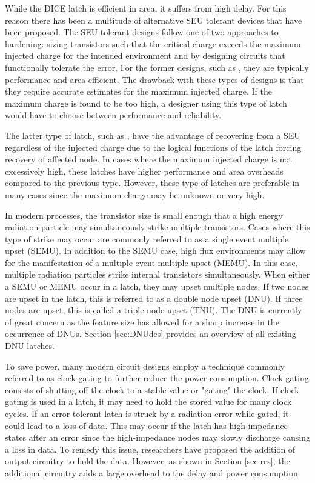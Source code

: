 While the DICE latch is efficient in area, it suffers from high delay. For this reason there has been a multitude of alternative SEU tolerant devices that have been proposed. The SEU tolerant designs follow one of two approaches to hardening: sizing transistors such that the critical charge exceeds the maximum injected charge for the intended environment and by designing circuits that functionally tolerate the error. For the former designs, such as \cite{NicoFeedback}, they are typically performance and area efficient. The drawback with these types of designs is that they require accurate estimates for the maximum injected charge. If the maximum charge is found to be too high, a designer using this type of latch would have to choose between performance and reliability. 

The latter type of latch, such as \cite{HIPER, FERST, Hazucha, SEMULatch, Multivdd, BISER}, have the advantage of recovering from a SEU regardless of the injected charge due to the logical functions of the latch forcing recovery of affected node. In cases where the maximum injected charge is not excessively high, these latches have higher performance and area overheads compared to the previous type. However, these type of latches are preferable in many cases since the maximum charge may be unknown or very high. 

In modern processes, the transistor size is small enough that a high energy radiation particle may simultaneously strike multiple transistors. Cases where this type of strike may occur are commonly referred to as a single event multiple upset (SEMU). In addition to the SEMU case, high flux environments may allow for the manifestation of a multiple event multiple upset (MEMU). In this case, multiple radiation particles strike internal transistors simultaneously. When either a SEMU or MEMU occur in a latch, they may upset multiple nodes. If two nodes are upset in the latch, this is referred to as a double node upset (DNU). If three nodes are upset, this is called a triple node upset (TNU). The DNU is currently of great concern as the feature size has allowed for a sharp increase in the occurrence of DNUs. Section \ref{sec:DNUdes} provides an overview of all existing DNU latches.     

To save power, many modern circuit designs employ a technique commonly referred to as clock gating to further reduce the power consumption. Clock gating consists of shutting off the clock to a stable value or "gating" the clock. If clock gating is used in a latch, it may need to hold the stored value for many clock cycles. If an error tolerant latch is struck by a radiation error while gated, it could lead to a loss of data. This may occur if the latch has high-impedance states after an error since the high-impedance nodes may slowly discharge causing a loss in data. To remedy this issue, researchers have proposed the addition of output circuitry to hold the data. However, as shown in Section \ref{sec:res}, the additional circuitry adds a large overhead to the delay and power consumption.

